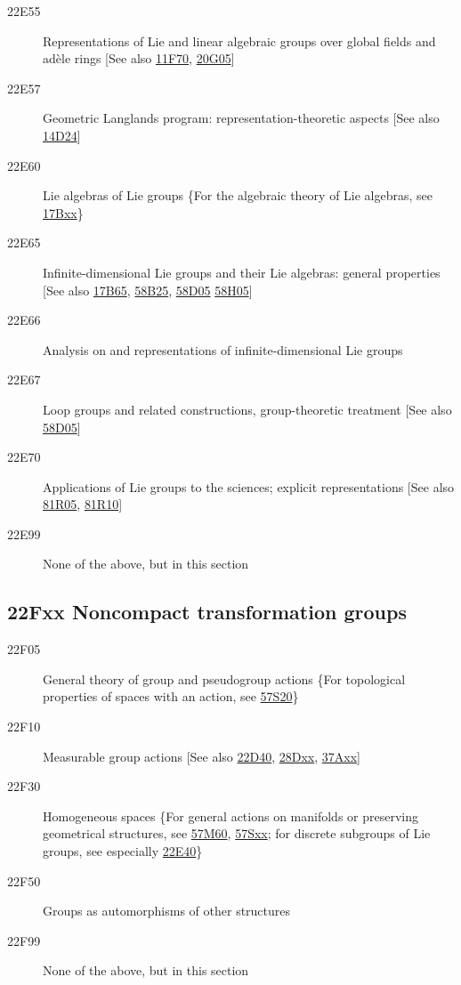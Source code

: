 \begin{description}
\item [22E55]\label{22E55} Representations of Lie and linear algebraic groups over global fields and ad\`{e}le rings [See also \hyperref[11F70]{11F70}, \hyperref[20G05]{20G05}]
\item [22E57]\label{22E57} Geometric Langlands program: representation-theoretic aspects [See also \hyperref[14D24]{14D24}]
\item [22E60]\label{22E60} Lie algebras of Lie groups \{For the algebraic theory of Lie algebras, see \hyperref[17Bxx]{17Bxx}\}
\item [22E65]\label{22E65} Infinite-dimensional Lie groups and their Lie algebras: general properties [See also \hyperref[17B65]{17B65}, \hyperref[58B25]{58B25}, \hyperref[58D05]{58D05} \hyperref[58H05]{58H05}]
\item [22E66]\label{22E66} Analysis on and representations of infinite-dimensional Lie groups
\item [22E67]\label{22E67} Loop groups and related constructions, group-theoretic treatment [See also \hyperref[58D05]{58D05}]
\item [22E70]\label{22E70} Applications of Lie groups to the sciences; explicit representations [See also \hyperref[81R05]{81R05}, \hyperref[81R10]{81R10}]
\item [22E99]\label{22E99} None of the above, but in this section
\end{description}
\subsection*{22Fxx  Noncompact transformation groups }\label{22Fxx}
\begin{description} 
\item [22F05]\label{22F05} General theory of group and pseudogroup actions \{For topological properties of spaces with an action, see \hyperref[57S20]{57S20}\}
\item [22F10]\label{22F10} Measurable group actions [See also \hyperref[22D40]{22D40}, \hyperref[28Dxx]{28Dxx}, \hyperref[37Axx]{37Axx}]
\item [22F30]\label{22F30} Homogeneous spaces \{For general actions on manifolds or preserving geometrical structures, see \hyperref[57M60]{57M60}, \hyperref[57Sxx]{57Sxx}; for discrete subgroups of Lie groups, see especially  \hyperref[22E40]{22E40}\}
\item [22F50]\label{22F50} Groups as automorphisms of other structures
\item [22F99]\label{22F99} None of the above, but in this section
\end{description}
